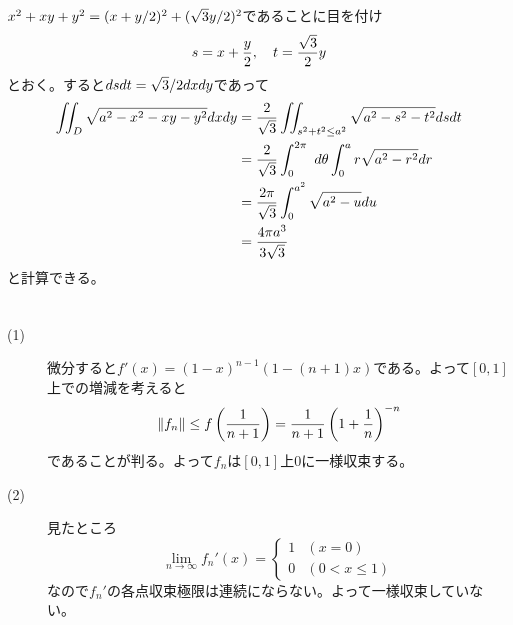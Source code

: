 \newpage

\subsubsection{}%
\begin{sol}
  $x^2 + xy  + y^2 = (x + y/2)^2 + (\sqrt{3}y/2)^2$であることに目を付け
\[
s = x +  \frac{y}{2} , \quad t = \frac{ \sqrt{3}}{2} y
\]
とおく。すると$ds dt = \sqrt{3}/ 2 dx dy $であって
\begin{align*}
  \iint_D \sqrt{a^2 - x^2 - xy - y^2} dx dy &= \frac{2}{\sqrt{3}} \iint_{s^2 + t^2 \leq a^2} \sqrt{a^2 - s^2 - t^2} ds dt \\
  &= \frac{2}{\sqrt{3}} \int_0^{2 \pi} \ d{\theta} \int_0^a r \sqrt{a^2 - r^2} dr \\
  &= \frac{2 \pi}{\sqrt{3}} \int_0^{a^2}  \sqrt{a^2 - u} du \\
  &= \frac{ 4 \pi a^3 }{ 3 \sqrt{3}}
\end{align*}
と計算できる。
\end{sol}

\newpage

\subsubsection{}%
\begin{sol} ${}$
  \begin{description}
    \item[(1)] 微分すると$f'(x) = (1-x)^{n-1} (1 - (n+1)x)$である。よって$[0,1]$上での増減を考えると
\[
\left \lVert f_n \right \rVert \leq f \left( \frac{1}{n+1} \right) = \frac{1}{n+1} \left( 1 + \frac{1}{n} \right)^{-n}
\]
であることが判る。よって$f_n$は$[0,1]$上$0$に一様収束する。
\item[(2)] 見たところ
\[
\lim_{n \to \infty} f_n'(x) = \begin{cases}
1 &(x=0) \\
0 &(0 < x \leq 1)
\end{cases}
\]
なので$f_n'$の各点収束極限は連続にならない。よって一様収束していない。
  \end{description}
\end{sol}
